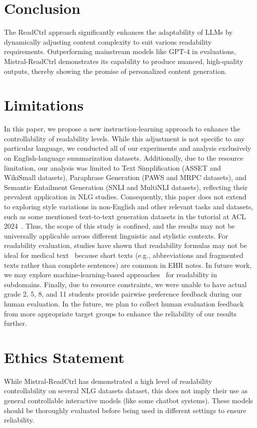 \documentclass[11pt]{article}
\begin{document}
\section{Conclusion}
The ReadCtrl approach significantly enhances the adaptability of LLMs by dynamically adjusting content complexity to suit various readability requirements. Outperforming mainstream models like GPT-4 in evaluations, Mistral-ReadCtrl demonstrates its capability to produce nuanced, high-quality outputs, thereby showing the promise of personalized content generation.





\section{Limitations}
In this paper, we propose a new instruction-learning approach to enhance the controllability of readability levels. While this adjustment is not specific to any particular language, we conducted all of our experiments and analysis exclusively on English-language summarization datasets. 
Additionally, due to the resource limitation, our analysis was limited to Text Simplification (ASSET and WikiSmall datasets), Paraphrase Generation (PAWS and MRPC datasets), and Semantic Entailment Generation (SNLI and MultiNLI datasets), reflecting their prevalent application in NLG studies. Consequently, this paper does not extend to exploring style variations in non-English and other relevant tasks and datasets, such as some mentioned text-to-text generation datasets in the tutorial at ACL 2024~\cite{dou2023automatic}.
Thus, the scope of this study is confined, and the results may not be universally applicable across different linguistic and stylistic contexts.
For readability evaluation, studies have shown that readability formulas may not be ideal for medical text~\cite{zheng2017readability} because short texts (e.g., abbreviations and fragmented texts rather than complete sentences) are common in EHR notes.  In future work, we may explore machine-learning-based approaches~\cite{zheng2018assessing} for readability in subdomains.
Finally, due to resource constraints, we were unable to have actual grade 2, 5, 8, and 11 students provide pairwise preference feedback during our human evaluation. In the future, we plan to collect human evaluation feedback from more appropriate target groups to enhance the reliability of our results further.


\section{Ethics Statement}
While Mistral-ReadCtrl has demonstrated a high level of readability controllability on several NLG datasets dataset, this does not imply their use as general controllable interactive models (like some chatbot systems). These models should be thoroughly evaluated before being used in different settings to ensure reliability.
\end{document}

